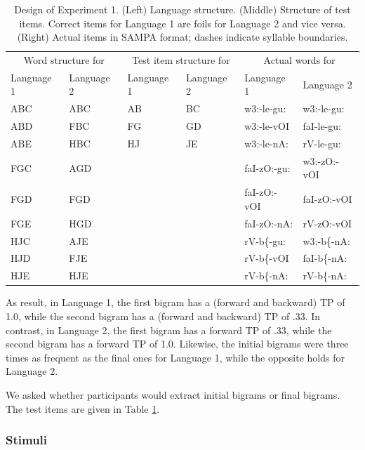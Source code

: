 \documentclass[]{article}
\begin{document}
\begin{table}[hbp]

\caption{\label{tab:stats-london-print-language-structure}Design of Experiment 1. (Left) Language structure. (Middle) Structure of test items. Correct items for Language 1 are foils for Language 2 and vice versa. (Right) Actual items in SAMPA format; dashes indicate syllable boundaries.}
\centering
\begin{tabular}[t]{llllll}
\toprule
\multicolumn{2}{c}{Word structure for} & \multicolumn{2}{c}{Test item structure for} & \multicolumn{2}{c}{Actual words for} \\
Language 1 & Language 2 & Language 1 & Language 2 & Language 1 & Language 2\\
\midrule
ABC & ABC & AB & BC & w3:-le-gu: & w3:-le-gu:\\
ABD & FBC & FG & GD & w3:-le-vOI & faI-le-gu:\\
ABE & HBC & HJ & JE & w3:-le-nA: & rV-le-gu:\\
FGC & AGD &  &  & faI-zO:-gu: & w3:-zO:-vOI\\
FGD & FGD &  &  & faI-zO:-vOI & faI-zO:-vOI\\
\addlinespace
FGE & HGD &  &  & faI-zO:-nA: & rV-zO:-vOI\\
HJC & AJE &  &  & rV-b\{-gu: & w3:-b\{-nA:\\
HJD & FJE &  &  & rV-b\{-vOI & faI-b\{-nA:\\
HJE & HJE &  &  & rV-b\{-nA: & rV-b\{-nA:\\
\bottomrule
\end{tabular}
\end{table}

As result, in Language 1, the first bigram has a (forward and backward) TP of 1.0, while the second bigram has a (forward and backward) TP of .33. In contrast, in Language 2, the first bigram has a forward TP of .33, while the second bigram has a forward TP of 1.0. Likewise, the initial bigrams were three times as frequent as the final ones for Language 1, while the opposite holds for Language 2.

We asked whether participants would extract initial bigrams or final bigrams. The test items are given in Table \ref{tab:stats-london-print-language-structure}.

\subsubsection{Stimuli}\label{stimuli}
\end{document}
